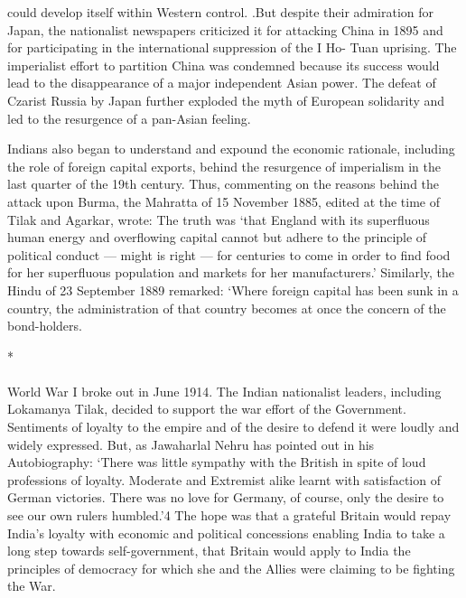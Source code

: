 could develop itself within Western control. .But despite their admiration for Japan, the nationalist newspapers criticized it for attacking China in 1895 and for participating in the international suppression of the I Ho- Tuan uprising. The imperialist effort to partition China was condemned because its success would lead to the disappearance of a major independent Asian power. The defeat of Czarist Russia by Japan further exploded the myth of European solidarity and led to the resurgence of a pan-Asian feeling. 

Indians also began to understand and expound the economic rationale, including the role of foreign capital exports, behind the resurgence of imperialism in the last quarter of the 19th century. Thus, commenting on the reasons behind the attack upon Burma, the Mahratta of 15 November 1885, edited at the time of Tilak and Agarkar, wrote: The truth was `that England with its superfluous human energy and overflowing capital cannot but adhere to the principle of political conduct — might is right — for centuries to come in order to find food for her superfluous population and markets for her manufacturers.' Similarly, the Hindu of 23 September 1889 remarked: `Where foreign capital has been sunk in a country, the administration of that country becomes at once the concern of the bond-holders.

\begin{center}*\end{center}

\paragraph*{}


World War I broke out in June 1914. The Indian nationalist leaders, including Lokamanya Tilak, decided to support the war effort of the Government. Sentiments of loyalty to the empire and of the desire to defend it were loudly and widely expressed. But, as Jawaharlal Nehru has pointed out in his Autobiography: `There was little sympathy with the British in spite of loud professions of loyalty. Moderate and Extremist alike learnt with satisfaction of German victories. There was no love for Germany, of course, only the desire to see our own rulers humbled.'4 The hope was that a grateful Britain would repay India's loyalty with economic and political concessions enabling India to take a long step towards self-government, that Britain would apply to India the principles of democracy for which she and the Allies were claiming to be fighting the War. 

